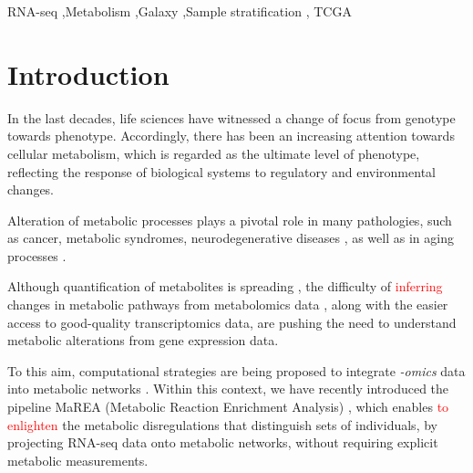 \documentclass[preprint,12pt,authoryear]{elsarticle}
\begin{document}
\begin{frontmatter}
  \begin{keyword}
    RNA-seq \sep Metabolism \sep Galaxy \sep Sample stratification \sep
    TCGA



  \end{keyword}

\end{frontmatter}




\section{Introduction}

In the last decades, life sciences have witnessed a change of focus
from genotype towards phenotype. Accordingly, there has been an
increasing attention towards cellular metabolism, which is regarded as
the ultimate level of phenotype, reflecting the response of biological
systems to regulatory and environmental changes.

Alteration of metabolic processes plays a pivotal role in many
pathologies, such as cancer, metabolic syndromes, neurodegenerative
diseases \citep{hotamisligil2006inflammation,ward2012metabolic}, as
well as in aging processes \citep{lopez2016metabolic}.

Although quantification of metabolites is spreading
\citep{Holmes2008}, the difficulty of \textcolor{red}{inferring}
changes in metabolic pathways from metabolomics data
\citep{damiani2016linking}, along with the easier access to
good-quality transcriptomics data, are pushing the need to understand
metabolic alterations from gene expression data.

To this aim, computational strategies are being proposed to integrate
\textit{-omics} data into metabolic networks
\citep{machado2014systematic,yizhak2015modeling,opdam2017systematic}. Within
this context, we have recently introduced the pipeline \textsf{MaREA}
(Metabolic Reaction Enrichment Analysis) \citep{marea}, which enables
\textcolor{red}{to enlighten} the metabolic disregulations that
distinguish sets of individuals, by projecting RNA-seq data onto
metabolic networks, without requiring explicit metabolic
measurements.
\end{document}
